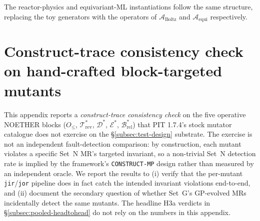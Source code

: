 The reactor-physics and equivariant-ML instantiations follow the same structure, replacing the toy generators with the operators of $\mathcal{A}_{\mathrm{Boltz}}$ and $\mathcal{A}_{\mathrm{equi}}$ respectively.

\section{Construct-trace consistency check on hand-crafted block-targeted mutants}
\label{app:augmented-stratum}

This appendix reports a \emph{construct-trace consistency check} on
the five operative NOETHER blocks ($O_{\le}$,
$\mathcal{T}^{*}_{\mathrm{rev}}$, $\mathcal{D}^{*}$, $\mathcal{E}^{*}$,
$\mathcal{B}^{*}_{\mathrm{rel}}$) that PIT 1.7.4's stock mutator
catalogue does not exercise on the
\S\ref{subsec:test-design} substrate. The exercise is not an
independent fault-detection comparison: by construction, each mutant
violates a specific Set~N MR's targeted invariant, so a non-trivial
Set~N detection rate is implied by the framework's
\texttt{CONSTRUCT-MP} design rather than measured by an independent
oracle. We report the results to (i) verify that the per-mutant
\texttt{jir}/\texttt{jor} pipeline does in fact catch the intended
invariant violations end-to-end, and (ii) document the secondary
question of whether Set~G's GP-evolved MRs incidentally detect the
same mutants. The headline H3a verdicts in \S\ref{subsec:pooled-headtohead}
do not rely on the numbers in this appendix.

